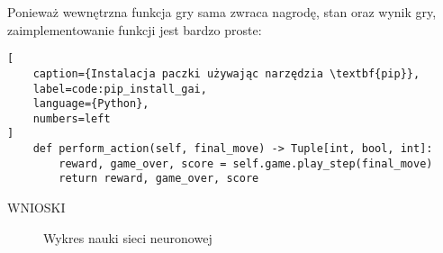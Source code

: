 \clearpage

Ponieważ wewnętrzna funkcja  gry sama zwraca nagrodę, stan oraz wynik gry, zaimplementowanie funkcji  jest bardzo proste:


\begin{onepage}
    \begin{lstlisting}[
    caption={Instalacja paczki używając narzędzia \textbf{pip}},
    label=code:pip_install_gai,
    language={Python},
    numbers=left
]
    def perform_action(self, final_move) -> Tuple[int, bool, int]:
        reward, game_over, score = self.game.play_step(final_move)
        return reward, game_over, score
    \end{lstlisting}
\end{onepage}


WNIOSKI


\begin{figure}[h]
    \centering
    \caption{Wykres nauki sieci neuronowej}
    \label{img:ai_graph}
\end{figure}
